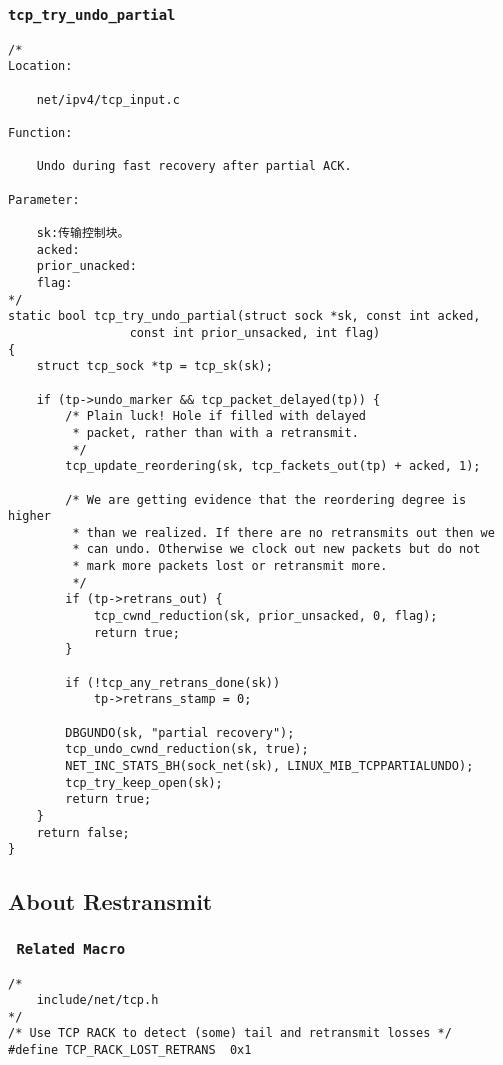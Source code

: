		\subsubsection{\texttt{tcp_try_undo_partial}}
\begin{verbatim}
/*
Location:

	net/ipv4/tcp_input.c

Function:

	Undo during fast recovery after partial ACK. 

Parameter:

	sk:传输控制块。
	acked:
	prior_unacked:
	flag:
*/
static bool tcp_try_undo_partial(struct sock *sk, const int acked,
				 const int prior_unsacked, int flag)
{
	struct tcp_sock *tp = tcp_sk(sk);

	if (tp->undo_marker && tcp_packet_delayed(tp)) {
		/* Plain luck! Hole if filled with delayed
		 * packet, rather than with a retransmit.
		 */
		tcp_update_reordering(sk, tcp_fackets_out(tp) + acked, 1);

		/* We are getting evidence that the reordering degree is higher
		 * than we realized. If there are no retransmits out then we
		 * can undo. Otherwise we clock out new packets but do not
		 * mark more packets lost or retransmit more.
		 */
		if (tp->retrans_out) {
			tcp_cwnd_reduction(sk, prior_unsacked, 0, flag);
			return true;
		}

		if (!tcp_any_retrans_done(sk))
			tp->retrans_stamp = 0;

		DBGUNDO(sk, "partial recovery");
		tcp_undo_cwnd_reduction(sk, true);
		NET_INC_STATS_BH(sock_net(sk), LINUX_MIB_TCPPARTIALUNDO);
		tcp_try_keep_open(sk);
		return true;
	}
	return false;
}
\end{verbatim}
	\subsection{About Restransmit}
		\subsubsection{\texttt{ Related Macro}}
\begin{verbatim}
/*
	include/net/tcp.h
*/
/* Use TCP RACK to detect (some) tail and retransmit losses */
#define TCP_RACK_LOST_RETRANS  0x1
\end{verbatim}


